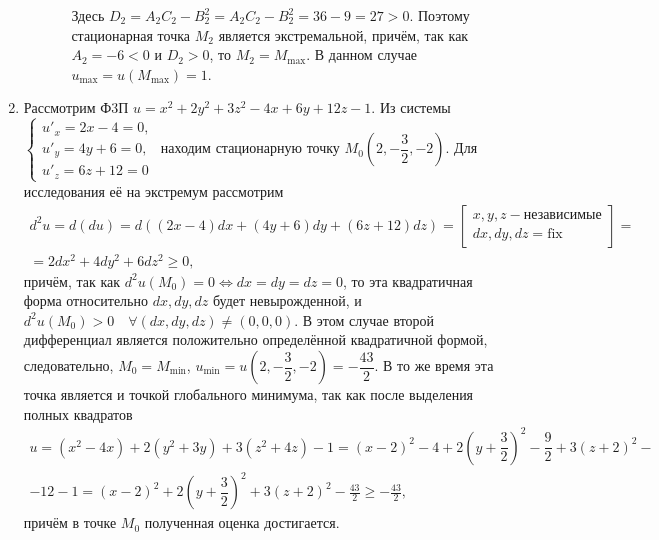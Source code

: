 \documentclass[../../main.tex]{subfiles}
\begin{document}
\begin{exmps}
\begin{enumerate}[label=\arabic*)]
\begin{itemize}
\begin{enumerate}[label=\arabic*.]
                Здесь $D_2 = A_2C_2 - B_2^2 =
                A_2C_2 - B_2^2 = 36 - 9 = 27 > 0$. Поэтому стационарная
                точка $M_2$ является экстремальной, причём, так как $A_2 = -6 <
                0$ и $D_2 > 0$, то $M_2 = M_{\max}$. В данном случае
                $u_{\max} = u(M_{\max}) = 1$.
            \end{enumerate}
        \end{itemize}
        \item Рассмотрим Ф3П $u = x^2 + 2y^2 + 3z^2 - 4x + 6y +12z-1$.
        Из системы
        $\begin{cases}
            u'_x = 2x-4 = 0, \\
            u'_y = 4y+6 = 0, \\
            u'_z = 6z+12 = 0
        \end{cases}$ находим стационарную точку $M_0\left(2, -\dfrac32,
        -2\right)$. Для исследования её на экстремум рассмотрим
        \begin{multline*}
            d^2u = d(du) = d((2x-4)dx+(4y+6)dy+(6z+12)dz) =
            \left[
                \begin{gathered}
                    x, y, z - \text{независимые} \\
                    dx, dy, dz = \text{fix}
                \end{gathered}
            \right] = \\ = 2dx^2 + 4dy^2 + 6dz^2 \geq 0,
        \end{multline*}
        причём, так как $d^2u(M_0)=0 \iff dx=dy=dz=0$, то эта квадратичная
        форма относительно $dx, dy, dz$ будет невырожденной, и $d^2u(M_0)>0
        \quad \forall (dx, dy, dz) \ne (0,0,0)$. В этом случае второй
        дифференциал является положительно определённой квадратичной формой,
        следовательно, $M_0 = M_{\min}$, $u_{\min} = u\left(2, -\dfrac32,
        -2\right) = -\dfrac{43}2$. В то же время эта точка является и точкой
        глобального минимума, так как после выделения полных квадратов
        \begin{multline*}
            u = (x^2-4x) + 2(y^2+3y) + 3(z^2+4z)-1 = (x-2)^2 - 4 + 2\left(y+
            \dfrac32\right)^2 - \dfrac92 + 3(z+2)^2 -\\- 12 - 1 = (x-2)^2 +
            2\left(y+\dfrac32\right)^2 + 3(z+2)^2 - \frac{43}2 \geq
            -\frac{43}2,
        \end{multline*}
        причём в точке $M_0$ полученная оценка достигается.
    \end{enumerate}
    \end{exmps}
\end{document}
